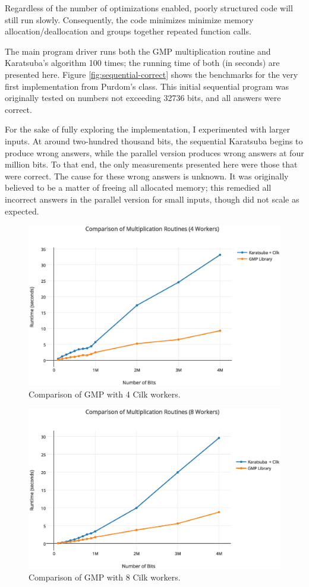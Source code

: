 \documentclass[8pt, twocolumn]{article}
\begin{document}
Regardless of the number of optimizations enabled, poorly structured code will
still run slowly. Consequently, the code minimizes minimize memory
allocation/deallocation and groups together repeated function calls.

The main program driver runs both the GMP multiplication routine and Karatsuba's
algorithm 100 times; the running time of both (in seconds) are presented here.
Figure \ref{fig:sequential-correct} shows the benchmarks for the very first
implementation from Purdom's class. This initial sequential program was
originally tested on numbers not exceeding 32736 bits, and all answers were
correct.

For the sake of fully exploring the implementation, I experimented with larger inputs.
 At around two-hundred thousand bits, the sequential Karatsuba
begins to produce wrong answers, while the parallel version produces wrong
answers at four million bits.  To that end, the only measurements presented here
were those that were correct.  The cause for these wrong answers is unknown.  It
was originally believed to be a matter of freeing all allocated memory; this
remedied all incorrect answers in the parallel version for small inputs,
though did not scale as expected. \newline
\begin{figure}[t]
    \includegraphics[scale=0.4]{4-workers}
    \caption{Comparison of GMP with 4 Cilk workers.}
    \label{fig:4-workers}
\end{figure}
\begin{figure}[t]
    \includegraphics[scale=0.4]{8-workers}
    \caption{Comparison of GMP with 8 Cilk workers.}
    \label{fig:8-workers}
\end{figure}
\end{document}
